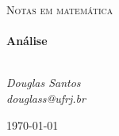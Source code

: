 \begin{titlepage}
   \begin{center}
      \textsc{\Large Notas em matemática}\\[0.5cm]

      \LinhaR \\[0.4cm]
         { \LARGE \bfseries Análise \\[0.4cm]}
      \LinhaR \\[1.4cm]

      \noindent
      \begin{minipage}{0.4\textwidth}
         \begin{center} \large
            \emph{Douglas Santos}\\
            \itshape{douglass@ufrj.br}
         \end{center}
      \end{minipage}

      \begin{center}
      \end{center}
      \vfill
      {\large \today}
   \end{center}
\end{titlepage}
\clearpage
